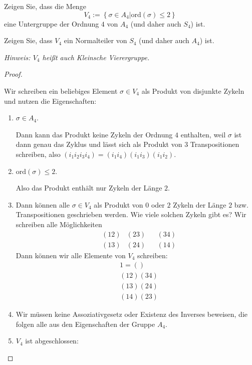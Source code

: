 \begin{Problem}
	\begin{parts}
	\item Zeigen Sie, dass die Menge
		\[
			V_4:=\left\{ \sigma\in A_4|\text{ord}(\sigma)\le 2 \right\} 
		\]
		eine Untergruppe der Ordnung $4$ von $A_4$ (und daher auch $S_4$) ist.
	\item Zeigen Sie, dass $V_4$ ein Normalteiler von $S_4$ (und daher auch $A_4$) ist.

		{\footnotesize \emph{Hinweis: $V_4$ heißt auch Kleinsche Vierergruppe.}}
	\end{parts}
\end{Problem}
\begin{proof}
	\begin{parts}
	\item Wir schreiben ein beliebiges Element $\sigma\in V_4$ als Produkt von disjunkte Zykeln und nutzen die Eigenschaften:
\begin{enumerate}[label=(\roman*)]
	\item $\sigma\in A_4$.
		
		Dann kann das Produkt keine Zykeln der Ordnung $4$ enthalten, weil $\sigma$ ist dann genau das Zyklus und lässt sich als Produkt von $3$ Transpositionen schreiben, also $(i_1i_2i_3i_4)=(i_1i_4)(i_1i_3)(i_1i_2)$. 
	\item $\text{ord}(\sigma)\le 2$. 

		Also das Produkt enthält nur Zykeln der Länge $2$.
	\item Dann können alle $\sigma\in V_4$ als Produkt von $0$ oder $2$ Zykeln der Länge $2$ bzw. Transpositionen geschrieben werden.  Wie viele solchen Zykeln gibt es? Wir schreiben alle Möglichkeiten
	\begin{align*}
		& (12) & (23) & & (34) \\ & (13) & (24) & & (14)
	\end{align*}
	Dann können wir alle Elemente von $V_4$ schreiben:
	\begin{align*}
		& 1 = \left( \right) \\
		& (12)(34)\\
		& (13)(24)\\
		& (14)(23)
	\end{align*}
\item Wir müssen keine Assoziativgesetz oder Existenz des Inverses beweisen, die folgen alle aus den Eigenschaften der Gruppe $A_4$.
\item $V_4$ ist abgeschlossen:


\end{enumerate}
\end{parts}
\end{proof}
